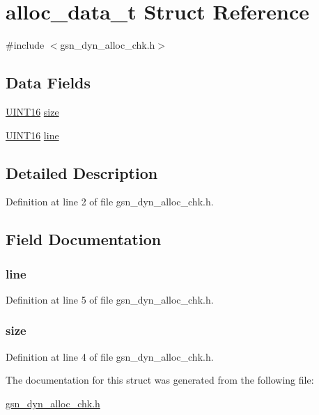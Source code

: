 \hypertarget{a00001}{
\section{alloc\_\-data\_\-t Struct Reference}
\label{a00001}
}


{\ttfamily \#include $<$gsn\_\-dyn\_\-alloc\_\-chk.h$>$}

\subsection*{Data Fields}
\begin{DoxyCompactItemize}
\item 
\hyperlink{a00660_ga09f1a1fb2293e33483cc8d44aefb1eb1}{UINT16} \hyperlink{a00001_a68890417cb73114517d0d8c594bd282e}{size}
\item 
\hyperlink{a00660_ga09f1a1fb2293e33483cc8d44aefb1eb1}{UINT16} \hyperlink{a00001_acd66efc8fb2ae836a233c186bf8001f2}{line}
\end{DoxyCompactItemize}


\subsection{Detailed Description}


Definition at line 2 of file gsn\_\-dyn\_\-alloc\_\-chk.h.



\subsection{Field Documentation}
\hypertarget{a00001_acd66efc8fb2ae836a233c186bf8001f2}{
\subsubsection[{line}]{ {\bf line}}}
\label{a00001_acd66efc8fb2ae836a233c186bf8001f2}


Definition at line 5 of file gsn\_\-dyn\_\-alloc\_\-chk.h.

\hypertarget{a00001_a68890417cb73114517d0d8c594bd282e}{
\subsubsection[{size}]{ {\bf size}}}
\label{a00001_a68890417cb73114517d0d8c594bd282e}


Definition at line 4 of file gsn\_\-dyn\_\-alloc\_\-chk.h.



The documentation for this struct was generated from the following file:\begin{DoxyCompactItemize}
\item 
\hyperlink{a00488}{gsn\_\-dyn\_\-alloc\_\-chk.h}\end{DoxyCompactItemize}
